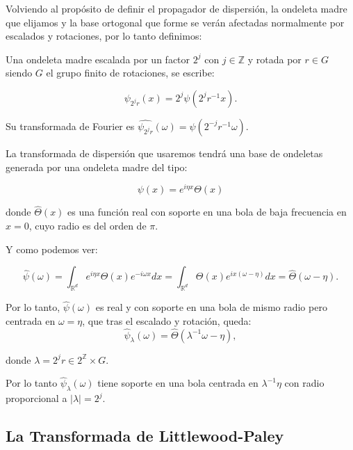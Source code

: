 \medskip 

\noindent Volviendo al propósito de definir el propagador de dispersión, la ondeleta madre que elijamos y la base ortogonal que forme se verán afectadas normalmente por escalados y rotaciones, por lo tanto definimos: 

\begin{definicion}
  Una ondeleta madre escalada por un factor $2^{j}$ con $j \in \mathbb{Z}$ y rotada por $r \in G$ siendo $G$ el grupo finito de rotaciones, se escribe: 

  $$\psi_{2^j r}(x)=2^{j} \psi(2^j r^{-1} x).$$
\end{definicion}


\medskip

\noindent Su transformada de Fourier es $\widehat{\psi_{2^j r}}(\omega)=\widehat{\psi}(2^{-j} r^{-1} \omega)$.

\medskip

\noindent La transformada de dispersión que usaremos tendrá una base de ondeletas generada por una ondeleta madre del tipo:

$$\psi(x)=e^{i\eta x} \Theta(x)$$

\noindent donde $\widehat{\Theta}(x)$ es una función real con soporte en una bola de baja frecuencia en $x=0$, cuyo radio es del orden de $\pi$.

\medskip

\noindent Y como podemos ver:

\begin{equation}
  \widehat{\psi}(\omega)=\int_{\mathbb{R}^d}e^{i \eta x} \Theta(x) e^{-i\omega x} dx=\int_{\mathbb{R}^d}\Theta(x) e^{ix(\omega-\eta)} dx=\widehat{\Theta}(\omega-\eta).
\end{equation}

\medskip

\noindent Por lo tanto, $\widehat{\psi}(\omega)$ es real y con soporte en una bola de mismo radio pero centrada en $\omega=\eta$, que tras el escalado y rotación, queda: 
$$\widehat{\psi}_\lambda(\omega)= \widehat{\Theta} (\lambda^{-1}\omega-\eta),$$ 

\noindent donde $\lambda=2^jr \in 2^{\mathbb{Z}}\times G$. 

\noindent Por lo tanto $\widehat{\psi}_\lambda(\omega)$ tiene soporte en una bola centrada en $\lambda^{-1}\eta$ con radio proporcional a $|\lambda|=2^j$.
 
\medskip 

\subsection{La Transformada de Littlewood-Paley} \label{ch:seccion12}

